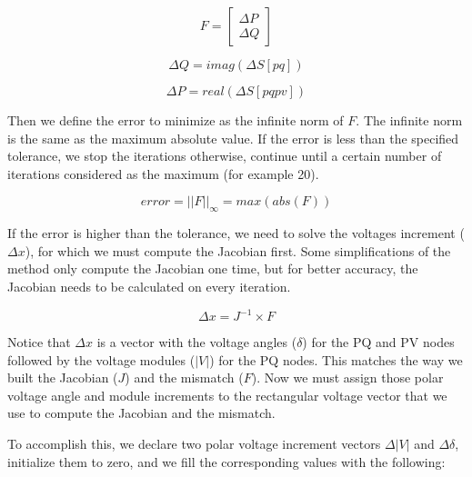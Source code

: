 \documentclass[a4paper,twoside,fleqn]{tufte-book}
\begin{document}
\begin{equation}
F =  \left[
\begin{array}{c}
\Delta P \\
\Delta Q  
\end{array}
\right]
\label{eq:nr_mismatch}
\end{equation}

\begin{equation}
\Delta Q = imag(\Delta S[pq]) 
\label{eq:nr_q_inc}
\end{equation}

\begin{equation}
\Delta P = real(\Delta S[pqpv])
\label{eq:nr_p_inc}
\end{equation}

Then we define the error to minimize as the infinite norm of $F$. The infinite norm is the same as the maximum absolute value. If the error is less than the specified tolerance, we stop the iterations otherwise, continue until a certain number of iterations considered as the maximum (for example 20).

\begin{equation}
error = ||F||_{\infty} = max(abs(F))
\label{eq:nr_error}
\end{equation}

If the error is higher than the tolerance, we need to solve the voltages increment ($\Delta x$), for which we must compute the Jacobian first. Some simplifications of the method only compute the Jacobian one time, but for better accuracy, the Jacobian needs to be calculated on every iteration.


\begin{equation}
\Delta x = J^{-1} \times F
\label{eq:nr_solve}
\end{equation}

Notice that $\Delta x$ is a vector with the voltage angles ($\delta$) for the PQ and PV nodes followed by the voltage modules ($|V|$) for the PQ nodes. This matches the way we built the Jacobian ($J$) and the mismatch ($F$). Now we must assign those polar voltage angle and module increments to the rectangular voltage vector that we use to compute the Jacobian and the mismatch.

To accomplish this, we declare two polar voltage increment vectors $\Delta |V|$ and $\Delta \delta$, initialize them to zero, and we fill the corresponding values with the following:
\end{document}
